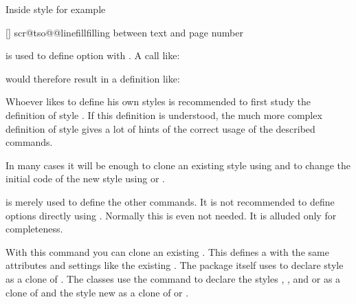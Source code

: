 Inside style  for example
\begin{lstcode}
  [\TOCLineLeaderFill]%
  {scr@tso@}{@linefill}{filling between text and page number}%
\end{lstcode}
is used to define option  with 
. A call like:
\begin{lstcode}
\end{lstcode}
would therefore result in a definition like:
\begin{lstcode}
  \def\scr@tso@part@linefill{\TOCLineLeaderFill}
\end{lstcode}

Whoever likes to define his own styles is recommended to first study the
definition of style . If this definition is understood,
the much more complex definition of style  gives a lot of
hints of the correct usage of the described commands.

In many cases it will be enough to clone an existing style using
 and to change the initial code of
the new style using  or
.

 is merely used to define the other
commands. It is not recommended to define options directly using
. Normally this is even not needed. It is
alluded only for completeness.%
\EndIndexGroup


\begin{Declaration}
\end{Declaration}
With this command you can clone
an existing . This defines a  with the same
attributes and settings like the existing . The package itself
uses  to declare style  as a clone
of . The \KOMAScript{} classes use the command to
declare the styles , , and  or
 as a clone of  and the style
 new as a clone of  or .%
\EndIndexGroup


